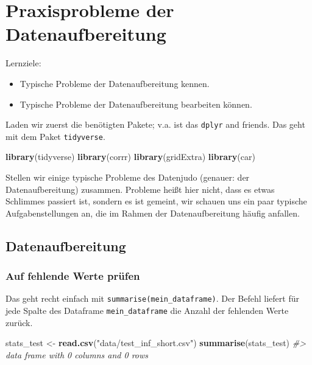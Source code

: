 \documentclass[12pt,ngerman,]{book}
\makeatletter
\newenvironment{Shaded}{\begin{snugshade}}{\end{snugshade}}
\newcommand{\KeywordTok}[1]{\textcolor[rgb]{0.13,0.29,0.53}{\textbf{{#1}}}}
\newcommand{\StringTok}[1]{\textcolor[rgb]{0.31,0.60,0.02}{{#1}}}
\newcommand{\CommentTok}[1]{\textcolor[rgb]{0.56,0.35,0.01}{\textit{{#1}}}}
\newcommand{\NormalTok}[1]{{#1}}
\providecommand{\tightlist}{%
  \setlength{\itemsep}{0pt}\setlength{\parskip}{0pt}}
\newenvironment{kframe}{%
\medskip{}
\setlength{\fboxsep}{.8em}
 \def\at@end@of@kframe{}%
 \ifinner\ifhmode%
  \def\at@end@of@kframe{\end{minipage}}%
  \begin{minipage}{\columnwidth}%
 \fi\fi%
 \def\FrameCommand##1{\hskip\@totalleftmargin \hskip-\fboxsep
 \colorbox{shadecolor}{##1}\hskip-\fboxsep
     \hskip-\linewidth \hskip-\@totalleftmargin \hskip\columnwidth}%
 \MakeFramed {\advance\hsize-\width
   \@totalleftmargin\z@ \linewidth\hsize
   \@setminipage}}%
 {\par\unskip\endMakeFramed%
 \at@end@of@kframe}
\renewenvironment{Shaded}{\begin{kframe}}{\end{kframe}}
\theoremstyle{definition}
\theoremstyle{definition}
\theoremstyle{remark}
\let\BeginKnitrBlock\begin \let\EndKnitrBlock\end
\makeatother
\begin{document}
\chapter{Praxisprobleme der
Datenaufbereitung}\label{praxisprobleme-der-datenaufbereitung}

\BeginKnitrBlock{rmdcaution}
Lernziele:

\begin{itemize}
\tightlist
\item
  Typische Probleme der Datenaufbereitung kennen.
\item
  Typische Probleme der Datenaufbereitung bearbeiten können.
\end{itemize}
\EndKnitrBlock{rmdcaution}

Laden wir zuerst die benötigten Pakete; v.a. ist das \texttt{dplyr} and
friends. Das geht mit dem Paket \texttt{tidyverse}.

\begin{Shaded}
\begin{Highlighting}[]
\KeywordTok{library}\NormalTok{(tidyverse)}
\KeywordTok{library}\NormalTok{(corrr)}
\KeywordTok{library}\NormalTok{(gridExtra)}
\KeywordTok{library}\NormalTok{(car)}
\end{Highlighting}
\end{Shaded}

Stellen wir einige typische Probleme des Datenjudo (genauer: der
Datenaufbereitung) zusammen. Probleme heißt hier nicht, dass es etwas
Schlimmes passiert ist, sondern es ist gemeint, wir schauen uns ein paar
typische Aufgabenstellungen an, die im Rahmen der Datenaufbereitung
häufig anfallen.

\section{Datenaufbereitung}\label{datenaufbereitung}

\subsection{Auf fehlende Werte prüfen}\label{auf-fehlende-werte-prufen}

Das geht recht einfach mit \texttt{summarise(mein\_dataframe)}. Der
Befehl liefert für jede Spalte des Dataframe \texttt{mein\_dataframe}
die Anzahl der fehlenden Werte zurück.

\begin{Shaded}
\begin{Highlighting}[]
\NormalTok{stats_test <-}\StringTok{ }\KeywordTok{read.csv}\NormalTok{(}\StringTok{"data/test_inf_short.csv"}\NormalTok{)}
\KeywordTok{summarise}\NormalTok{(stats_test)}
\CommentTok{#> data frame with 0 columns and 0 rows}
\end{Highlighting}
\end{Shaded}
\end{document}
